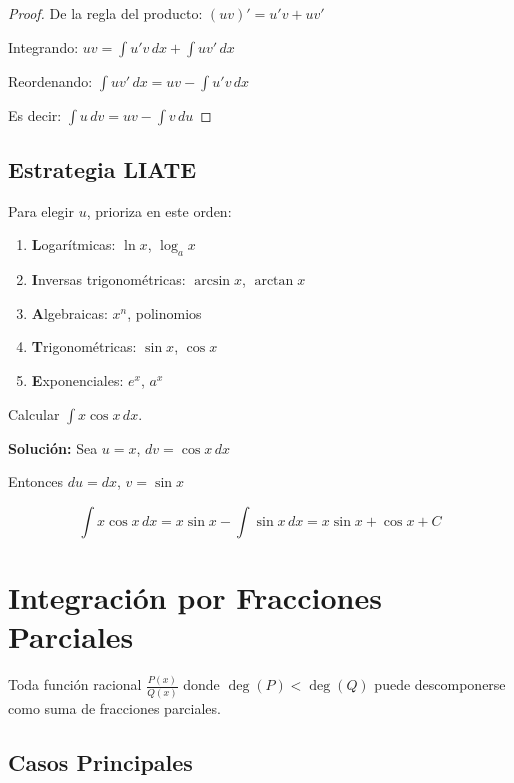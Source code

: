 \documentclass[12pt, a4paper]{book}
\begin{document}
\begin{proof}
De la regla del producto: $(uv)' = u'v + uv'$

Integrando: $uv = \int u'v \, dx + \int uv' \, dx$

Reordenando: $\int uv' \, dx = uv - \int u'v \, dx$

Es decir: $\int u \, dv = uv - \int v \, du$
\end{proof}

\subsection{Estrategia LIATE}

Para elegir $u$, prioriza en este orden:
\begin{enumerate}
    \item \textbf{L}ogarítmicas: $\ln x$, $\log_a x$
    \item \textbf{I}nversas trigonométricas: $\arcsin x$, $\arctan x$
    \item \textbf{A}lgebraicas: $x^n$, polinomios
    \item \textbf{T}rigonométricas: $\sin x$, $\cos x$
    \item \textbf{E}xponenciales: $e^x$, $a^x$
\end{enumerate}

\begin{ejemplo}
Calcular $\int x \cos x \, dx$.

\textbf{Solución:}
Sea $u = x$, $dv = \cos x \, dx$

Entonces $du = dx$, $v = \sin x$

\[
\int x \cos x \, dx = x \sin x - \int \sin x \, dx = x \sin x + \cos x + C
\]
\end{ejemplo}

\section{Integración por Fracciones Parciales}

\begin{teorema}
Toda función racional $\frac{P(x)}{Q(x)}$ donde $\deg(P) < \deg(Q)$ puede descomponerse como suma de fracciones parciales.
\end{teorema}

\subsection{Casos Principales}
\end{document}
